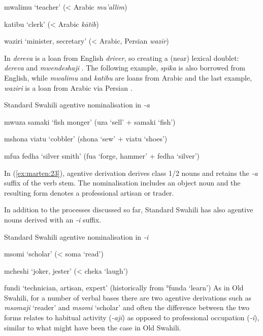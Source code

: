 \documentclass[output=paper]{langscibook}
\begin{document}
    \ex\label{ex:marten:22c}  mwalimu    ‘teacher’ (< Arabic \textit{mu’allim})

    \ex\label{ex:marten:22d}  katibu      ‘clerk’  (< Arabic \textit{kātib})

    \ex\label{ex:marten:22e}   waziri      ‘minister, secretary’ (< Arabic, Persian \textit{wazīr})
    \z
\z

In  \textit{dereva} is a loan from English \textit{driver}, so creating a (near) lexical doublet: \textit{dereva} and \textit{mwendeshaji} . The following example, \textit{spika}  is also borrowed from English, while \textit{mwalimu}  and \textit{katibu}  are loans from Arabic and the last example, \textit{waziri}  is a loan from Arabic via Persian \citep[222]{Lodhi2000}.

\ea\label{ex:marten:23}Standard Swahili agentive nominalisation in \textit{{}-a} 

    \ea\label{ex:marten:23a}  mwuza samaki    ‘fish monger’ (uza ‘sell’ + samaki ‘fish’)

    \ex\label{ex:marten:23b}  mshona viatu      ‘cobbler’ (shona ‘sew’ + viatu ‘shoes’)

    \ex\label{ex:marten:23c}  mfua fedha        ‘silver smith’ (fua ‘forge, hammer’ + fedha ‘silver’)
    \z
\z

In (\ref{ex:marten:23}), agentive derivation derives class 1/2 nouns and retains the \textit{{}-a} suffix of the verb stem. The nominalisation includes an object noun and the resulting form denotes a professional artisan or trader.

\newpage
  In addition to the processes discussed so far, Standard Swahili has also agentive nouns derived with an \textit{{}-i} suffix. 

\ea\label{ex:marten:24}Standard Swahili agentive nominalisation in \textit{{}-i} 

    \ea\label{ex:marten:24a}  msomi     ‘scholar’ (< soma ‘read’)

    \ex\label{ex:marten:24b}  mcheshi    ‘joker, jester’ (< cheka ‘laugh’)

    \ex\label{ex:marten:24c}  fundi      ‘technician, artisan, expert’ (historically from °funda ‘learn’)
    \z
\z
As in Old Swahili, for a number of verbal bases there are two agentive derivations such as \textit{msomaji} ‘reader’  and \textit{msomi} ‘scholar’  and often the difference between the two forms relates to habitual activity (\textit{{}-aji}) as opposed to professional occupation (\textit{{}-i}), similar to what might have been the case in Old Swahili.
\end{document}
